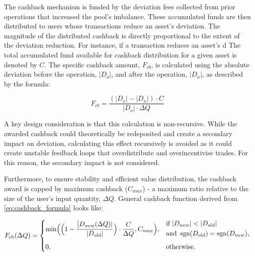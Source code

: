 The cashback mechanism is funded by the deviation fees collected from prior operations that increased the pool's imbalance. These accumulated funds are then distributed to users whose transactions reduce an asset's deviation. The magnitude of the distributed cashback is directly proportional to the extent of the deviation reduction. For instance, if a transaction reduces an asset's d 
The total accumulated fund available for cashback distribution for a given asset is denoted by $C$. The specific cashback amount, $F_{cb}$, is calculated using the absolute deviation before the operation, $|D_o|$, and after the operation, $|D_n|$, as described by the formula:

\begin{equation}
	\label{eq:cashback_formula}
	F_{cb} = \frac{(|D_o| - |D_n|) \cdot C}{|D_o| \cdot \Delta Q} 
\end{equation}

A key design consideration is that this calculation is non-recursive. While the awarded cashback could theoretically be redeposited and create a secondary impact on deviation, calculating this effect recursively is avoided as it could create unstable feedback loops that overdistribute and overincentivise trades. For this reason, the secondary impact is not considered. 

Furthermore, to ensure stability and efficient value distribution, the cashback award is capped by  maximum cashback ($C_{max}$) - a maximum ratio relative to the size of the user's input quantity, $\Delta Q$. General cashback function derived from \ref{eq:cashback_formula} looks like:

\begin{equation}
	\label{eq:invariant_swap_cashback_function}
	F_{\mathrm{cb}}(\Delta Q)
	=
	\begin{cases}
		\displaystyle
		\begin{aligned}
			\min\Bigl(
			\Bigl(1 - \frac{\bigl\lvert D_{new}(\Delta Q) \rvert}
			{\lvert D_{old}\rvert}\Bigr)
			\cdot \frac{C}{\Delta Q},C_{max}
			\Bigr),
		\end{aligned}
		&
		\begin{aligned}
			&\text{if }\lvert D_{new}\rvert
			< \lvert D_{old}\rvert\\
			& \text{and }\operatorname{sgn}(D_{old})
			= \operatorname{sgn}(D_{new}),
		\end{aligned}
		\\[3ex]
		0,
		& \text{otherwise.}
	\end{cases}
\end{equation}



